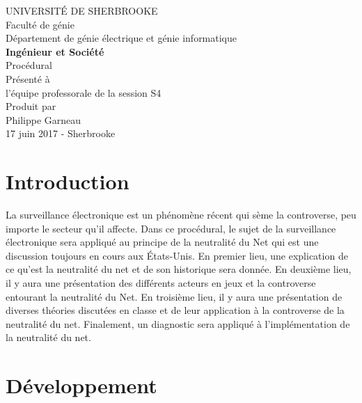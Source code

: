 \documentclass[12pt]{article}
\begin{document}
\begin{titlepage}   
	\large{
		\begin{center}
			UNIVERSITÉ DE SHERBROOKE\\Faculté de génie\\
			Département de génie électrique et génie informatique\\
			\vspace{3cm}
			{\LARGE\textbf{Ingénieur et Société}}\\
			\vspace{2cm}
			\LARGE{Procédural}\\
			\vspace{2cm}
			Présenté à\\l'équipe professorale de la session S4\\
			\vspace{2cm}
			Produit par\\Philippe Garneau\\
			\vspace{1cm}
			\vfill{17 juin 2017 - Sherbrooke}
		\end{center}
	}
\end{titlepage}
\newpage
\tableofcontents

\newpage
\section{Introduction}
La surveillance électronique est un phénomène récent qui sème la controverse, peu importe le secteur qu’il affecte. Dans ce procédural, le sujet de la surveillance électronique sera appliqué au principe de la neutralité du Net qui est une discussion toujours en cours aux États-Unis. En premier lieu, une explication de ce qu’est la neutralité du net et de son historique sera donnée. En deuxième lieu, il y aura une présentation des différents acteurs en jeux et la controverse entourant la neutralité du Net. En troisième lieu, il y aura une présentation de diverses théories discutées en classe et de leur application à la controverse de la neutralité du net. Finalement, un diagnostic sera appliqué à l’implémentation de la neutralité du net.

\section{Développement}
\end{document}
